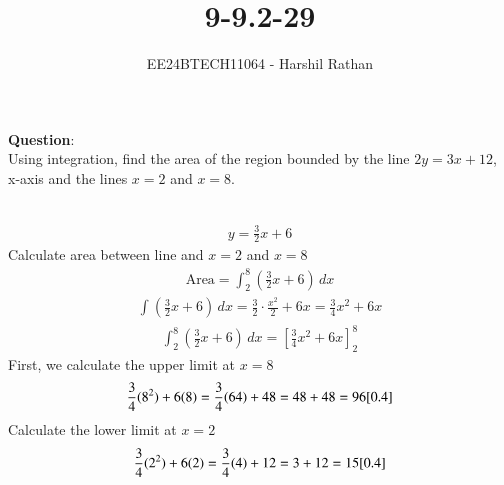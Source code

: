 \documentclass[journal]{IEEEtran}
\begin{document}

\vspace{3cm}

\title{9-9.2-29}
\author{EE24BTECH11064 - Harshil Rathan}
{\let\newpage\relax\maketitle}

\renewcommand{\thefigure}{\theenumi}
\renewcommand{\thetable}{\theenumi}
\setlength{\intextsep}{10pt} %


\renewcommand{\thetable}{\theenumi}
\textbf{Question}:\\
Using integration, find the area of the region bounded by the line $2y=3x+12$, x-axis and the lines $x=2$ and $x=8$.\\
\solution \\
\begin{table}[h!]
    \centering
    
\end{table}
\begin{align}
     y=\frac{3}{2}x+6
\end{align}
Calculate area between line and $x=2$ and $x=8$\\
\begin{align}    
     \text{Area}=\int_{2}^{8} \left( \frac{3}{2}x + 6 \right) \, dx
     \label{0.2}
\end{align}
\begin{align}
    \int \left( \frac{3}{2}x + 6 \right) \, dx = \frac{3}{2} \cdot \frac{x^2}{2} + 6x = \frac{3}{4}x^2 + 6x
    \label{0.3}
\end{align}
\begin{align}
    \int_{2}^{8} \left( \frac{3}{2}x + 6 \right) \, dx = \left[ \frac{3}{4}x^2 + 6x \right]_{2}^{8}
    \label{0.4}
\end{align}
First, we calculate the upper limit at $x=8$\\
\begin{align}
   \frac{3}{4}(8^2) + 6(8) = \frac{3}{4}(64) + 48 = 48 + 48 = 96 
   \ref{0.4}
\end{align}
Calculate the lower limit at $x=2$\\
\begin{align}
    \frac{3}{4}(2^2) + 6(2) = \frac{3}{4}(4) + 12 = 3 + 12 = 15
    \ref{0.4}
\end{align}
\end{document}
